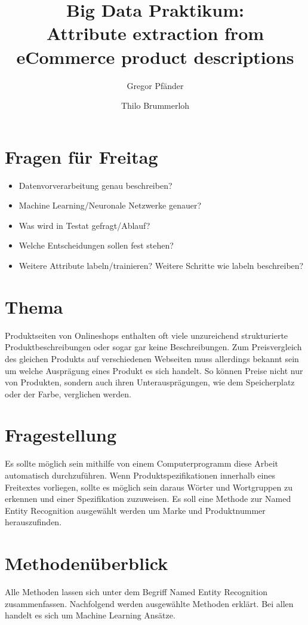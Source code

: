 \documentclass[paper=a4,12pt,listof=totoc]{scrartcl}%
\title{Big Data Praktikum: \\ Attribute extraction from eCommerce product descriptions}
\author{Gregor Pfänder 
\and Thilo Brummerloh}
\begin{document}
	\maketitle
	
	\section{Fragen für Freitag}
	\begin{itemize}
		\item Datenvorverarbeitung genau beschreiben?
		\item Machine Learning/Neuronale Netzwerke genauer?
		\item Was wird in Testat gefragt/Ablauf?
		\item Welche Entscheidungen sollen fest stehen?
		\item Weitere Attribute labeln/trainieren? Weitere Schritte wie labeln beschreiben?
	\end{itemize}
	
	\section{Thema}
	Produktseiten von Onlineshops enthalten oft viele unzureichend strukturierte Produktbeschreibungen oder sogar gar keine Beschreibungen. Zum Preisvergleich des gleichen Produkts auf verschiedenen Webseiten muss allerdings bekannt sein um welche Ausprägung eines Produkt es sich handelt. So können Preise nicht nur von Produkten, sondern auch ihren Unterausprägungen, wie dem Speicherplatz oder der Farbe, verglichen werden.
	
	\section{Fragestellung}
	Es sollte möglich sein mithilfe von einem Computerprogramm diese Arbeit automatisch durchzuführen. Wenn Produktspezifikationen innerhalb eines Freitextes vorliegen, sollte es möglich sein daraus Wörter und Wortgruppen zu erkennen und einer Spezifikation zuzuweisen.
	Es soll eine Methode zur Named Entity Recognition ausgewählt werden um Marke und Produktnummer herauszufinden.
	
	\section{Methodenüberblick}
	Alle Methoden lassen sich unter dem Begriff Named Entity Recognition zusammenfassen.	Nachfolgend werden ausgewählte Methoden erklärt. Bei allen handelt es sich um Machine Learning Ansätze. 
	
\end{document}
